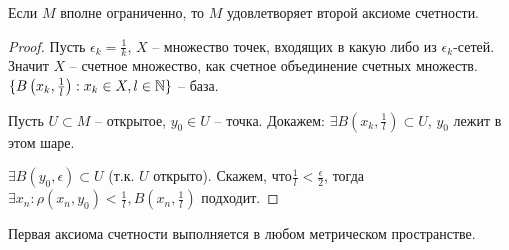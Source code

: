 \documentclass[main]{subfiles}
\begin{document}
\begin{proposition}
    Если $M$ вполне ограниченно, то $M$ удовлетворяет второй аксиоме счетности.
\end{proposition}
\begin{proof}
    Пусть $\epsilon_k = \frac{1}{k}$, $X$ -- множество точек, входящих в какую либо из $\epsilon_k$-сетей.
    Значит $X$ -- счетное множество, как счетное объединение счетных множеств.
    $\{B\left(x_k, \frac{1}{l}\right) : x_k \in X, l \in \mathbb{N}\}$ -- база.

    Пусть $U \subset M$ -- открытое, $y_0 \in U$ -- точка.
    Докажем: $\exists B\left(x_k, \frac{1}{l}\right)\subset U$, $y_0$ лежит в этом шаре.

    $\exists B(y_0, \epsilon) \subset U$ (т.к. $U$ открыто).
    Скажем, что$\frac{1}{l} < \frac{\epsilon}{2}$,
    тогда $\exists x_n: \rho(x_n, y_0) < \frac{1}{l}, B\left(x_n, \frac{1}{l}\right)$ подходит.
\end{proof}
\begin{remark}
    Первая аксиома счетности выполняется в любом метрическом пространстве.
\end{remark}
\end{document}
